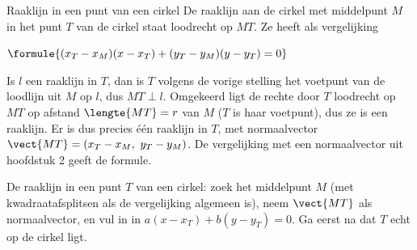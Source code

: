 \begin{theorie}
\begin{stelling}{Raaklijn in een punt van een cirkel}
De raaklijn aan de cirkel met middelpunt $M$ in het punt $T$ van de cirkel staat loodrecht op $MT$. Ze heeft als vergelijking

\vspace{1mm}
\qquad $\formule{(x_T - x_M)(x - x_T) + (y_T - y_M)(y - y_T) = 0}$
\end{stelling}
\begin{bewijs}
Is $l$ een raaklijn in $T$, dan is $T$ volgens de vorige stelling het voetpunt van de loodlijn uit $M$ op $l$, dus $MT \perp l$. Omgekeerd ligt de rechte door $T$ loodrecht op $MT$ op afstand $\lengte{MT} = r$ van $M$ ($T$ is haar voetpunt), dus ze is een raaklijn. Er is dus precies één raaklijn in $T$, met normaalvector $\vect{MT} = (x_T - x_M,\ y_T - y_M)$. De vergelijking met een normaalvector uit hoofdstuk 2 geeft de formule.
\end{bewijs}
\end{theorie}


\begin{werkwijze}
De raaklijn in een punt $T$ van een cirkel: zoek het middelpunt $M$ (met kwadraatafsplitsen als de vergelijking algemeen is), neem $\vect{MT}$ als normaalvector, en vul in in $a(x - x_T) + b(y - y_T) = 0$. Ga eerst na dat $T$ echt op de cirkel ligt.
\end{werkwijze}


